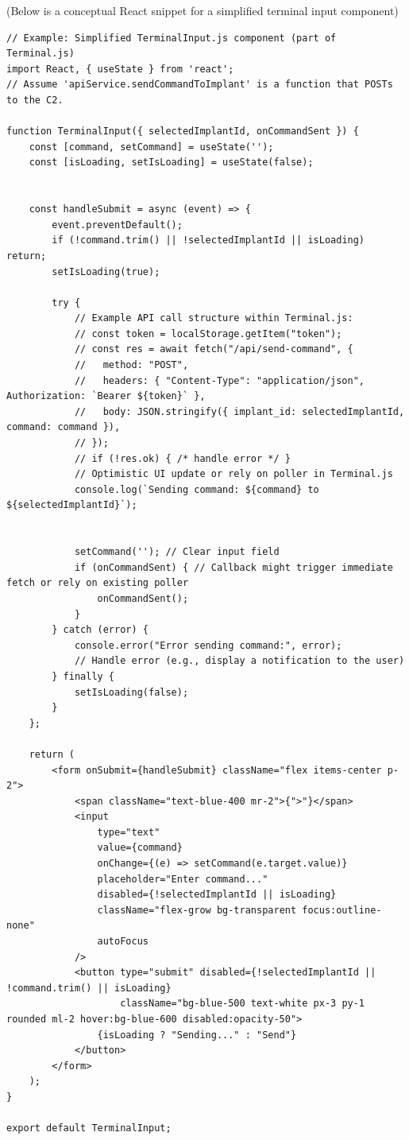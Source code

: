 (Below is a conceptual React snippet for a simplified terminal input component)
\begin{verbatim}
// Example: Simplified TerminalInput.js component (part of Terminal.js)
import React, { useState } from 'react';
// Assume 'apiService.sendCommandToImplant' is a function that POSTs to the C2.

function TerminalInput({ selectedImplantId, onCommandSent }) {
    const [command, setCommand] = useState('');
    const [isLoading, setIsLoading] = useState(false);


    const handleSubmit = async (event) => {
        event.preventDefault();
        if (!command.trim() || !selectedImplantId || isLoading) return;
        setIsLoading(true);

        try {
            // Example API call structure within Terminal.js:
            // const token = localStorage.getItem("token");
            // const res = await fetch("/api/send-command", {
            //   method: "POST",
            //   headers: { "Content-Type": "application/json", Authorization: `Bearer ${token}` },
            //   body: JSON.stringify({ implant_id: selectedImplantId, command: command }),
            // });
            // if (!res.ok) { /* handle error */ }
            // Optimistic UI update or rely on poller in Terminal.js
            console.log(`Sending command: ${command} to ${selectedImplantId}`);


            setCommand(''); // Clear input field
            if (onCommandSent) { // Callback might trigger immediate fetch or rely on existing poller
                onCommandSent();
            }
        } catch (error) {
            console.error("Error sending command:", error);
            // Handle error (e.g., display a notification to the user)
        } finally {
            setIsLoading(false);
        }
    };

    return (
        <form onSubmit={handleSubmit} className="flex items-center p-2">
            <span className="text-blue-400 mr-2">{">"}</span>
            <input
                type="text"
                value={command}
                onChange={(e) => setCommand(e.target.value)}
                placeholder="Enter command..."
                disabled={!selectedImplantId || isLoading}
                className="flex-grow bg-transparent focus:outline-none"
                autoFocus
            />
            <button type="submit" disabled={!selectedImplantId || !command.trim() || isLoading}
                    className="bg-blue-500 text-white px-3 py-1 rounded ml-2 hover:bg-blue-600 disabled:opacity-50">
                {isLoading ? "Sending..." : "Send"}
            </button>
        </form>
    );
}

export default TerminalInput;
\end{verbatim}

